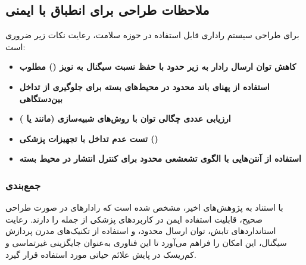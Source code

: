\subsection{ملاحظات طراحی برای انطباق با ایمنی} %
\label{sec:design-considerations-safety}

برای طراحی سیستم راداری  قابل استفاده در حوزه سلامت، رعایت نکات زیر ضروری است:
\begin{itemize}
    \item \textbf{کاهش توان ارسال رادار به زیر حدود  با حفظ نسبت سیگنال به نویز () مطلوب}
    \item \textbf{استفاده از پهنای باند محدود در محیط‌های بسته برای جلوگیری از تداخل بین‌دستگاهی}
    \item \textbf{ارزیابی عددی چگالی توان با روش‌های شبیه‌سازی  (مانند  یا )}
    \item \textbf{تست عدم تداخل با تجهیزات پزشکی ()}
    \item \textbf{استفاده از آنتن‌هایی با الگوی تشعشعی محدود برای کنترل انتشار در محیط بسته}
\end{itemize}

\subsubsection*{جمع‌بندی} %
\label{sec:safety-summary}

با استناد به پژوهش‌های اخیر، مشخص شده است که رادارهای  در صورت طراحی صحیح، قابلیت استفاده ایمن در کاربردهای پزشکی از جمله  را دارند. رعایت استانداردهای تابش، توان ارسال محدود، و استفاده از تکنیک‌های مدرن پردازش سیگنال، این امکان را فراهم می‌آورد تا این فناوری به‌عنوان جایگزینی غیرتماسی و کم‌ریسک در پایش علائم حیاتی مورد استفاده قرار گیرد.
